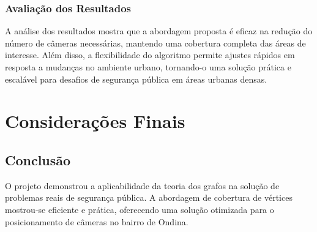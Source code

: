 \documentclass[12pt, a4paper]{report}
\begin{document}
\subsection{Avaliação dos Resultados}
A análise dos resultados mostra que a abordagem proposta é eficaz na redução do número de câmeras necessárias, mantendo uma cobertura completa das áreas de interesse. Além disso, a flexibilidade do algoritmo permite ajustes rápidos em resposta a mudanças no ambiente urbano, tornando-o uma solução prática e escalável para desafios de segurança pública em áreas urbanas densas.

\chapter{Considerações Finais}

\section{Conclusão}
O projeto demonstrou a aplicabilidade da teoria dos grafos na solução de problemas reais de segurança pública. A abordagem de cobertura de vértices mostrou-se eficiente e prática, oferecendo uma solução otimizada para o posicionamento de câmeras no bairro de Ondina.

\newpage
\renewcommand{\refname}{Referências Bibliográficas}

\nocite{*}
\end{document}
